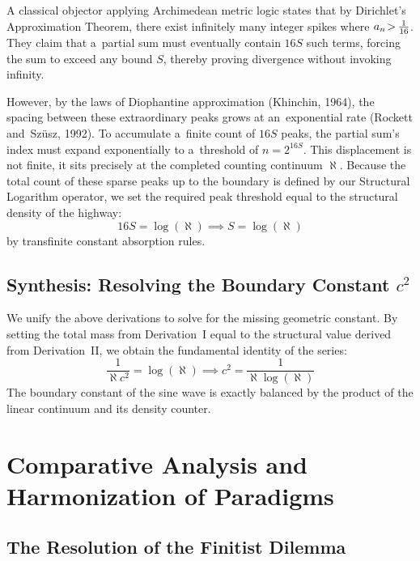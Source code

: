 \documentclass[11pt,a4paper]{article}
\newcommand\nfex{\hspace{-0.2ex}} %
\theoremstyle{definition}
\theoremstyle{noperiod}
\begin{document}
A classical objector applying Archimedean metric logic states that by Dirichlet's Approximation Theorem, there exist infinitely many integer spikes where $a_n \nfex\nfex > \nfex \frac{1}{16}$. They claim that a~partial sum must eventually contain $16S$ such terms, forcing the sum to exceed any bound $S$, thereby proving divergence without invoking infinity.

However, by the laws of Diophantine approximation (Khinchin, 1964\cite{khinchin1964}), the spacing between these extraordinary peaks grows at an~exponential rate (Rockett and~Szüsz, 1992\cite{rockett1992}). To accumulate a~finite count of $16S$ peaks, the partial sum's index must expand exponentially to a~threshold of $n = 2^{16S}$. This displacement is not finite, it sits precisely at the completed counting continuum $\aleph$. Because the total count of these sparse peaks up to the boundary is defined by our Structural Logarithm operator, we set the required peak threshold equal to the structural density of the highway:
\begin{equation}
16S = \log(\aleph) \implies S = \log(\aleph)
\end{equation}
by transfinite constant absorption rules.

\subsection{Synthesis: Resolving the Boundary Constant $c^2$}We unify the above derivations to solve for the missing geometric constant. By setting the total mass from Derivation~I equal to the structural value derived from Derivation~II, we obtain the fundamental identity of the series:
\begin{equation}
\frac{1}{\aleph c^2} = \log(\aleph) \implies c^2 = \frac{1}{\aleph \log(\aleph)}
\end{equation}
The boundary constant of the sine wave is exactly balanced by the product of the linear continuum and its density counter.

\section{Comparative Analysis and Harmonization of Paradigms}

\subsection{The Resolution of the Finitist Dilemma}
\end{document}
